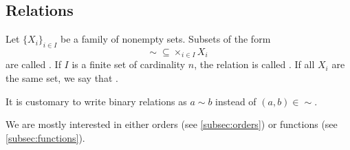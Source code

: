 \subsection{Relations}\label{subsec:relations}

\begin{definition}\label{def:relation}
  Let \( \{ X_i \}_{i \in I} \) be a family of nonempty sets.
  Subsets of the form
  \begin{equation*}
    \sim\; \subseteq \times_{i \in I} X_i
  \end{equation*}
  are called . If \( I \) is a finite set of cardinality \( n \), the relation is called . If all \( X_i \) are the same set, we say that .

  It is customary to write binary relations as \( a \sim b \) instead of \( (a, b) \in \sim \).
\end{definition}

\begin{remark}\label{remark:main_relation_types}
  We are mostly interested in either orders (see \cref{subsec:orders}) or functions (see \cref{subsec:functions}).
\end{remark}

